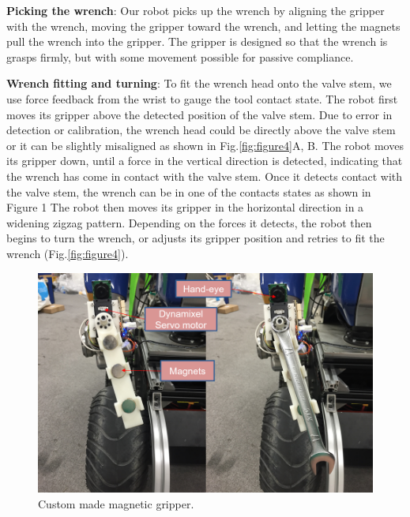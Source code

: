 \documentclass{standalone}
\begin{document}
\textbf{Picking the wrench}: Our robot picks up the wrench by aligning the gripper with the wrench, moving the gripper toward the wrench, and letting the magnets pull the wrench into the gripper. The gripper is designed so that the wrench is grasps firmly, but with some movement possible for passive compliance.

\textbf{Wrench fitting and turning}: To fit the wrench head onto the valve stem, we use force feedback from the wrist to gauge the tool contact state. The robot first moves its gripper above the detected position of the valve stem. Due to error in detection or calibration, the wrench head could be directly above the valve stem or it can be slightly misaligned as shown in Fig.\ref{fig:figure4}A, B. The robot moves its gripper down, until a force in the vertical direction is detected, indicating that the wrench has come in contact with the valve stem. Once it detects contact with the valve stem, the wrench can be in one of the contacts states as shown in Figure 1 The robot then moves its gripper in the horizontal direction in a widening zigzag pattern. Depending on the forces it detects, the robot then begins to turn the wrench, or adjusts its gripper position and retries to fit the wrench (Fig.\ref{fig:figure4}).

\begin{figure}
  \includegraphics[width=\columnwidth]{sections/task2/images/gripper}
  \caption{Custom made magnetic gripper.}
  \label{fig:figure2}
\end{figure}
\end{document}
